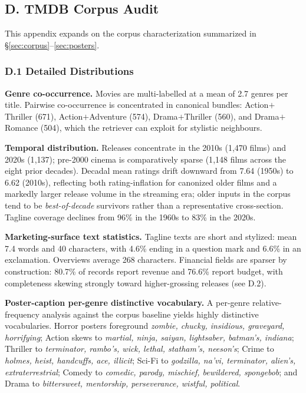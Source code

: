 \documentclass[10pt,twocolumn]{article}
\begin{document}
\subsection*{D. TMDB Corpus Audit}
\label{app:corpus_audit}

This appendix expands on the corpus characterization summarized
in \S\ref{sec:corpus}--\ref{sec:posters}.

\subsubsection*{D.1 Detailed Distributions}

\textbf{Genre co-occurrence.} Movies are multi-labelled at a
mean of 2.7 genres per title. Pairwise co-occurrence is
concentrated in canonical bundles: Action$+$Thriller (671),
Action$+$Adventure (574), Drama$+$Thriller (560), and
Drama$+$Romance (504), which the retriever can exploit for
stylistic neighbours.

\textbf{Temporal distribution.} Releases concentrate in the
2010s (1{,}470 films) and 2020s (1{,}137); pre-2000 cinema is
comparatively sparse (1{,}148 films across the eight prior
decades). Decadal mean ratings drift downward from 7.64 (1950s)
to 6.62 (2010s), reflecting both rating-inflation for canonized
older films and a markedly larger release volume in the
streaming era; older inputs in the corpus tend to be
\textit{best-of-decade} survivors rather than a representative
cross-section. Tagline coverage declines from 96\% in the
1960s to 83\% in the 2020s.

\textbf{Marketing-surface text statistics.} Tagline texts are
short and stylized: mean 7.4 words and 40 characters, with
4.6\% ending in a question mark and 6.6\% in an exclamation.
Overviews average 268 characters. Financial fields are sparser
by construction: 80.7\% of records report revenue and 76.6\%
report budget, with completeness skewing strongly toward
higher-grossing releases (see D.2).

\textbf{Poster-caption per-genre distinctive vocabulary.} A
per-genre relative-frequency analysis against the corpus
baseline yields highly distinctive vocabularies. Horror posters
foreground \textit{zombie, chucky, insidious, graveyard,
horrifying}; Action skews to \textit{martial, ninja, saiyan,
lightsaber, batman's, indiana}; Thriller to \textit{terminator,
rambo's, wick, lethal, statham's, neeson's}; Crime to
\textit{holmes, heist, handcuffs, ace, illicit}; Sci-Fi to
\textit{godzilla, na'vi, terminator, alien's, extraterrestrial};
Comedy to \textit{comedic, parody, mischief, bewildered,
spongebob}; and Drama to \textit{bittersweet, mentorship,
perseverance, wistful, political}.
\end{document}
